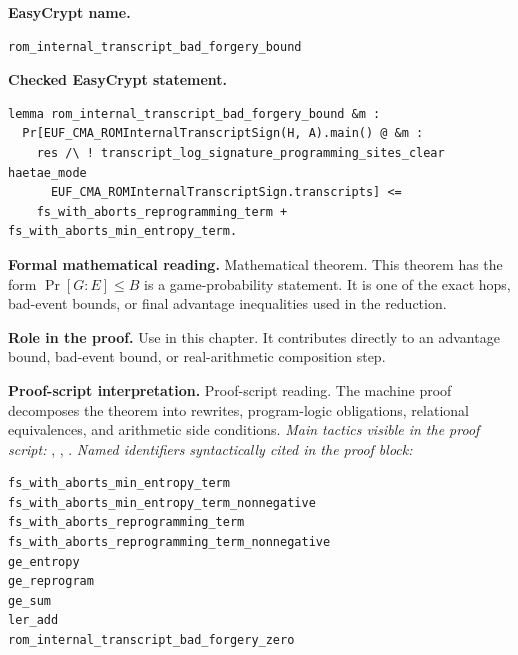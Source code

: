 \begin{formaltheorem}
\noindent\textbf{EasyCrypt name.}
\begin{lstlisting}[language=EasyCrypt,basicstyle=\ttfamily\scriptsize]
rom_internal_transcript_bad_forgery_bound
\end{lstlisting}
\noindent\textbf{Checked EasyCrypt statement.}
\begin{lstlisting}[language=EasyCrypt,basicstyle=\ttfamily\scriptsize]
lemma rom_internal_transcript_bad_forgery_bound &m :
  Pr[EUF_CMA_ROMInternalTranscriptSign(H, A).main() @ &m :
    res /\ ! transcript_log_signature_programming_sites_clear haetae_mode
      EUF_CMA_ROMInternalTranscriptSign.transcripts] <=
    fs_with_aborts_reprogramming_term + fs_with_aborts_min_entropy_term.
\end{lstlisting}
\noindent\textbf{Formal mathematical reading.}
Mathematical theorem. This theorem has the form \(\Pr[G:E] \le B\) is a game-probability statement.  It is one of the exact hops, bad-event bounds, or final advantage inequalities used in the reduction.

\noindent\textbf{Role in the proof.}
Use in this chapter. It contributes directly to an advantage bound, bad-event bound, or real-arithmetic composition step.

\noindent\textbf{Proof-script interpretation.}
Proof-script reading. The machine proof decomposes the theorem into rewrites, program-logic obligations, relational equivalences, and arithmetic side conditions.
\emph{Main tactics visible in the proof script:} , , .
\emph{Named identifiers syntactically cited in the proof block:}
\begin{lstlisting}[language=EasyCrypt,basicstyle=\ttfamily\scriptsize]
fs_with_aborts_min_entropy_term
fs_with_aborts_min_entropy_term_nonnegative
fs_with_aborts_reprogramming_term
fs_with_aborts_reprogramming_term_nonnegative
ge_entropy
ge_reprogram
ge_sum
ler_add
rom_internal_transcript_bad_forgery_zero
\end{lstlisting}

\end{formaltheorem}


